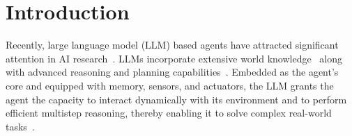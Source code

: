 \documentclass[pdflatex,sn-mathphys-num]{sn-jnl}%
\theoremstyle{thmstyleone}%
\theoremstyle{thmstyletwo}%
\theoremstyle{thmstylethree}%
\begin{document}
% 
% 
% 




\maketitle
\section{Introduction}\label{sec:introduction}
Recently, large language model (LLM) based agents have attracted significant attention in AI research~\cite{han2024llm,masterman2024landscape,xi2025rise}. LLMs incorporate extensive world knowledge~\cite{yu2024kola} along with advanced reasoning and planning capabilities~\cite{achiam2023gpt,bang2023multitask,valmeekam2023planbench}. Embedded as the agent's core and equipped with memory, sensors, and actuators, the LLM grants the agent the capacity to interact dynamically with its environment and to perform efficient multistep reasoning, thereby enabling it to solve complex real-world tasks~\cite{liu2024agentbench,sun2023adaplanner,hsiao2025critical}.
\end{document}
